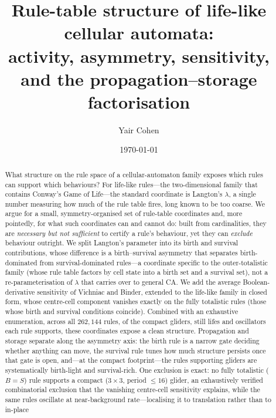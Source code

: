 \documentclass{article}
\begin{document}
\title{Rule-table structure of life-like cellular automata:\\
activity, asymmetry, sensitivity,\\
and the propagation--storage factorisation}
\author{Yair Cohen}
\date{\today}
\maketitle

\begin{abstract}
What structure on the rule space of a cellular-automaton family exposes which
rules can support which behaviours? For life-like rules---the two-dimensional
family that contains Conway's Game of Life---the standard coordinate is Langton's
$\lambda$, a single number measuring how much of the rule table fires, long known
to be too coarse. We argue for a small, symmetry-organised set
of rule-table coordinates and, more pointedly, for what such coordinates can and
cannot do: built from cardinalities, they are \emph{necessary but not sufficient}
to certify a rule's behaviour, yet they can \emph{exclude} behaviour outright. We
split Langton's parameter into its birth and survival contributions, whose
difference is a birth--survival asymmetry that separates birth-dominated from
survival-dominated rules---a coordinate specific to the outer-totalistic
family (whose rule table factors by cell state into a birth set and a
survival set), not a re-parameterisation of $\lambda$ that carries over to
general CA. We add the average Boolean-derivative sensitivity of
Vichniac and Binder, extended to the life-like family in closed form, whose
centre-cell component vanishes exactly on the fully totalistic rules (those whose
birth and survival conditions coincide). Combined with an exhaustive enumeration,
across all $262{,}144$ rules, of the compact gliders, still lifes and oscillators
each rule supports, these coordinates expose a clean structure. Propagation and
storage separate along the asymmetry axis: the birth rule is a narrow gate
deciding whether anything can move, the survival rule tunes how much structure
persists once that gate is open, and---at the compact footprint---the rules
supporting gliders are systematically birth-light and survival-rich. One exclusion
is exact: no fully totalistic ($B=S$) rule supports a compact ($3{\times}3$,
period $\le16$) glider, an exhaustively verified combinatorial exclusion that the
vanishing centre-cell sensitivity explains, while the same rules oscillate at
near-background rate---localising it to translation rather than to in-place

\end{abstract}
\end{document}
